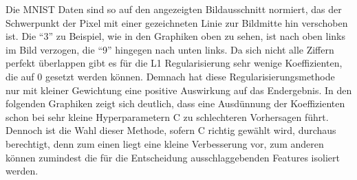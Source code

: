 Die MNIST Daten sind so auf den angezeigten Bildausschnitt normiert, das der Schwerpunkt der Pixel mit einer gezeichneten Linie zur Bildmitte hin verschoben ist. Die "`3"' zu Beispiel, wie in den Graphiken oben zu sehen, ist nach oben links im Bild verzogen, die "`9"' hingegen nach unten links.
Da sich nicht alle Ziffern perfekt überlappen gibt es für die L1 Regularisierung sehr wenige Koeffizienten, die auf 0 gesetzt werden können. Demnach hat diese Regularisierungsmethode nur mit kleiner Gewichtung eine positive Auswirkung auf das Endergebnis. In den folgenden Graphiken zeigt sich deutlich, dass eine Ausdünnung der Koeffizienten schon bei sehr kleine Hyperparametern C zu schlechteren Vorhersagen führt.
Dennoch ist die Wahl dieser Methode, sofern C richtig gewählt wird, durchaus berechtigt, denn zum einen liegt eine kleine Verbesserung vor, zum anderen können zumindest die für die Entscheidung ausschlaggebenden Features isoliert werden.\newpage
